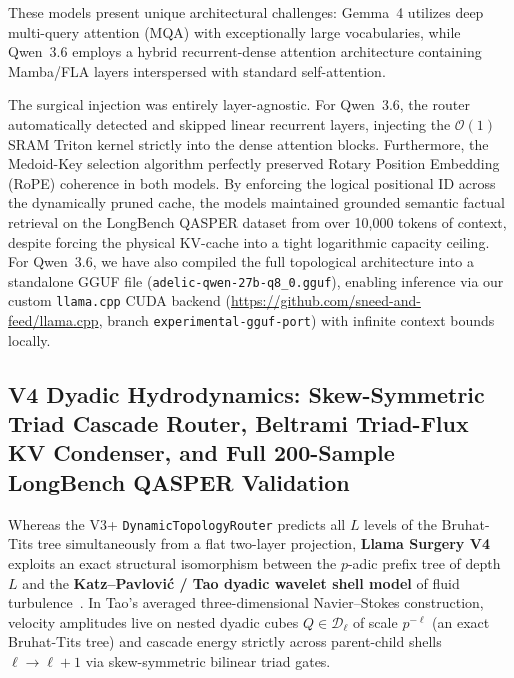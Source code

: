 \documentclass[11pt,a4paper]{article}
\begin{document}
These models present unique architectural challenges: Gemma~4 utilizes deep multi-query attention (MQA) with exceptionally large vocabularies, while Qwen~3.6 employs a hybrid recurrent-dense attention architecture containing Mamba/FLA layers interspersed with standard self-attention.

The surgical injection was entirely layer-agnostic. For Qwen~3.6, the router automatically detected and skipped linear recurrent layers, injecting the $\mathcal{O}(1)$ SRAM Triton kernel strictly into the dense attention blocks. Furthermore, the Medoid-Key selection algorithm perfectly preserved Rotary Position Embedding (RoPE) coherence in both models. By enforcing the logical positional ID across the dynamically pruned cache, the models maintained grounded semantic factual retrieval on the LongBench QASPER dataset from over 10{,}000 tokens of context, despite forcing the physical KV-cache into a tight logarithmic capacity ceiling. For Qwen~3.6, we have also compiled the full topological architecture into a standalone GGUF file (\texttt{adelic-qwen-27b-q8\_0.gguf}), enabling inference via our custom \texttt{llama.cpp} CUDA backend (\url{https://github.com/sneed-and-feed/llama.cpp}, branch \texttt{experimental-gguf-port}) with infinite context bounds locally.

\subsection{V4 Dyadic Hydrodynamics: Skew-Symmetric Triad Cascade Router, Beltrami Triad-Flux KV Condenser, and Full 200-Sample LongBench QASPER Validation}
\label{sec:v4_hydrodynamics}

Whereas the V3+ \texttt{DynamicTopologyRouter} predicts all $L$ levels of the Bruhat-Tits tree simultaneously from a flat two-layer projection, \textbf{Llama Surgery V4} exploits an exact structural isomorphism between the $p$-adic prefix tree of depth $L$ and the \textbf{Katz--Pavlovi\'c / Tao dyadic wavelet shell model} of fluid turbulence~\citep{katz2005dyadic,tao2016blowup}. In Tao's averaged three-dimensional Navier--Stokes construction, velocity amplitudes live on nested dyadic cubes $Q \in \mathcal{D}_\ell$ of scale $p^{-\ell}$ (an exact Bruhat-Tits tree) and cascade energy strictly across parent-child shells $\ell \to \ell+1$ via skew-symmetric bilinear triad gates.
\end{document}
